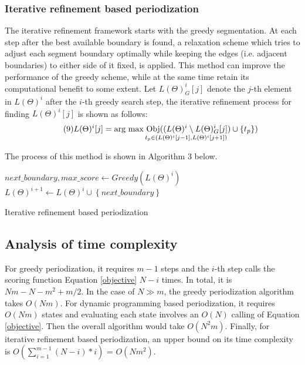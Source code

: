 \documentclass[output=paper]{langsci/langscibook}
\begin{document}
\subsubsection{Iterative refinement based periodization}

The iterative refinement framework starts with the greedy segmentation. At each step after the best available boundary is found, a relaxation scheme which tries to adjust each segment boundary optimally while keeping the edges (i.e. adjacent boundaries) to either side of it fixed, is applied. This method can improve the performance of the greedy scheme, while at the same time retain its computational benefit to some extent.
Let $L(\Theta)^{i}_{G}[j]$ denote the $j$-th element in $L(\Theta)^{i}$ after the $i$-th greedy search step, the iterative refinement process for finding $L(\Theta)^{i}[j]$ is shown as follows:
\begin{equation}\tag{9}
L(\Theta)^{i}[j] = \underset{t_{p} \in \left ( L(\Theta)^{i}[j - 1], L(\Theta)^{i}[j + 1] \right )}{\textup{arg max}\ \text{Obj}((L(\Theta)^{i} \setminus {L(\Theta)^{i}_{G}[j]})\cup \left \{ t_{p} \right \})}
\label{iterative_1}
\end{equation}

The process of this method is shown in Algorithm 3 below.
\begin{algorithm}
\SetAlgoLined
{}
{
$next\_boundary, max\_score \leftarrow Greedy(L(\Theta)^{i})$\;
$L(\Theta)^{i + 1} \leftarrow L(\Theta)^{i} \cup \left \{ next\_boundary \right \}$\;
}
\caption{Iterative refinement based periodization}
\end{algorithm}

\subsection{Analysis of time complexity}\label{sec:08-analysis-time-complexity}
For greedy periodization, it requires $m - 1$ steps and the $i$-th step calls the scoring function Equation \eqref{objective} $N - i$ times. In total, it is $Nm - N - m^{2} + m/2$. In the case of $N \gg m$, the greedy periodization algorithm takes $O(Nm)$. For dynamic programming based periodization, it requires $O(Nm)$ states and evaluating each state involves an $O(N)$ calling of Equation \eqref{objective}. Then the overall algorithm would take $O(N^{2}m)$. Finally, for iterative refinement based periodization, an upper bound on its time complexity is $O(\sum_{i = 1}^{m - 1}(N - i)*i)$ = $O(Nm^{2})$.
\end{document}

